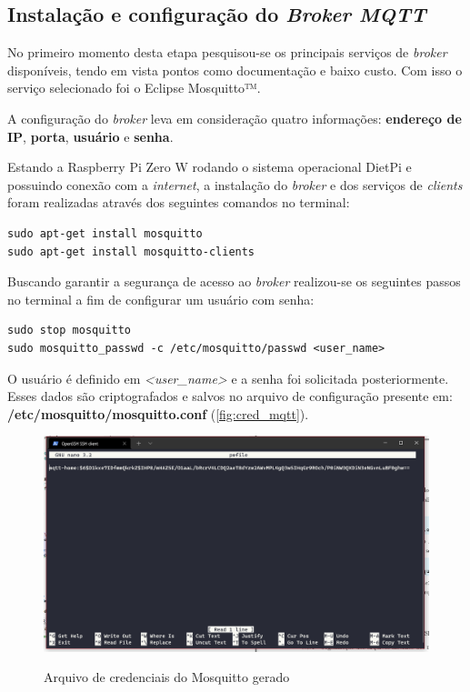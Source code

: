 \subsection {Instalação e configuração do \textit{Broker MQTT}}

No primeiro momento desta etapa pesquisou-se os principais serviços de \textit{broker} disponíveis, tendo em vista pontos como documentação e baixo custo. Com isso o serviço selecionado foi o Eclipse Mosquitto™.

A configuração do \textit{broker} leva em consideração quatro informações: \textbf{endereço de IP}, \textbf{porta}, \textbf{usuário} e \textbf{senha}.

Estando a Raspberry Pi Zero W rodando o sistema operacional DietPi e possuindo conexão com a \textit{internet}, a instalação do \textit{broker} e dos serviços de \textit{clients} foram realizadas através dos seguintes comandos no terminal:

\begin{lstlisting}
sudo apt-get install mosquitto
sudo apt-get install mosquitto-clients
\end{lstlisting}


Buscando garantir a segurança de acesso ao \textit{broker} realizou-se os seguintes passos no terminal a fim de configurar um usuário com senha:


\begin{lstlisting}
sudo stop mosquitto
sudo mosquitto_passwd -c /etc/mosquitto/passwd <user_name>
\end{lstlisting}

O usuário é definido em \textit{<user\_name>} e a senha foi solicitada posteriormente. Esses dados são criptografados e salvos no arquivo de configuração presente em: \textbf{/etc/mosquitto/mosquitto.conf} (\autoref{fig:cred_mqtt}).

\begin{figure}[H]
	\centering
	\caption{Arquivo de credenciais do Mosquitto gerado}
	\includegraphics[width=0.6
	\textwidth]{figuras/user_pass.png}
	\label{fig:cred_mqtt}
\end{figure}

